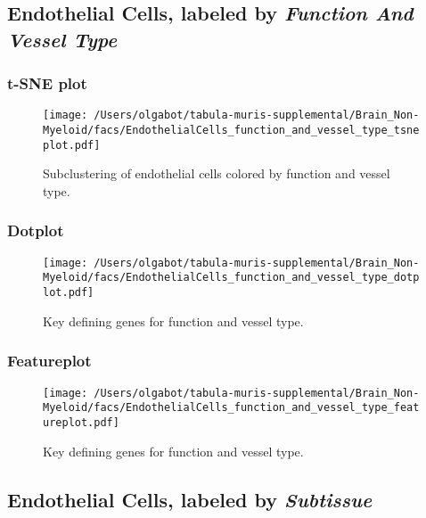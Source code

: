 \clearpage

\subsection{Endothelial Cells, labeled by \emph{Function And Vessel Type}}

\clearpage
\subsubsection{t-SNE plot}
\begin{figure}[h]
\centering
\texttt{[image: /Users/olgabot/tabula-muris-supplemental/Brain\_Non-Myeloid/facs/EndothelialCells\_function\_and\_vessel\_type\_tsneplot.pdf]}

\caption{Subclustering of endothelial cells colored by function and vessel type.
}
\end{figure}


\clearpage

\subsubsection{Dotplot}
\begin{figure}[h]
\centering
\texttt{[image: /Users/olgabot/tabula-muris-supplemental/Brain\_Non-Myeloid/facs/EndothelialCells\_function\_and\_vessel\_type\_dotplot.pdf]}

\caption{Key defining genes for function and vessel type.
}
\end{figure}


\clearpage

\subsubsection{Featureplot}
\begin{figure}[h]
\centering
\texttt{[image: /Users/olgabot/tabula-muris-supplemental/Brain\_Non-Myeloid/facs/EndothelialCells\_function\_and\_vessel\_type\_featureplot.pdf]}

\caption{Key defining genes for function and vessel type.
}
\end{figure}


\clearpage

\subsection{Endothelial Cells, labeled by \emph{Subtissue}}
